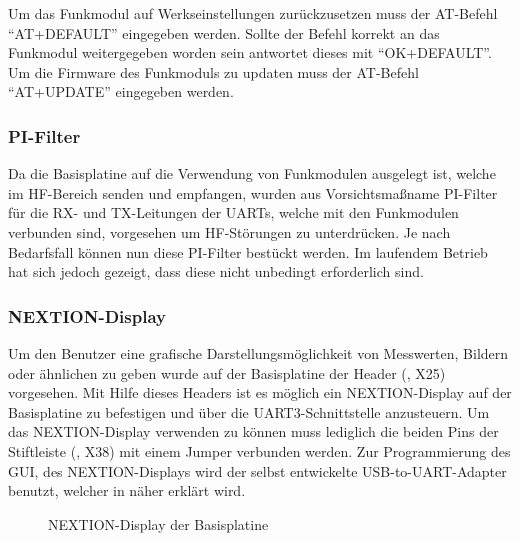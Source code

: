 Um das Funkmodul auf Werkseinstellungen zurückzusetzen muss der AT-Befehl \enquote{AT+DEFAULT} eingegeben werden. Sollte der Befehl korrekt an das Funkmodul weitergegeben worden sein antwortet dieses mit \enquote{OK+DEFAULT}. Um die Firmware des Funkmoduls zu updaten muss der AT-Befehl \enquote{AT+UPDATE} eingegeben werden.

\subsubsection{PI-Filter}
Da die \gls{Basisplatine} auf die Verwendung von Funkmodulen ausgelegt ist, welche im HF-Bereich senden und empfangen, wurden aus Vorsichtsmaßname PI-Filter für die RX- und TX-Leitungen der UARTs, welche mit den Funkmodulen verbunden sind, vorgesehen um HF-Störungen zu unterdrücken. Je nach Bedarfsfall können nun diese PI-Filter bestückt werden. Im laufendem Betrieb hat sich jedoch gezeigt, dass diese nicht unbedingt erforderlich sind.


\subsubsection{NEXTION-Display}
Um den Benutzer eine grafische Darstellungsmöglichkeit von Messwerten, Bildern oder ähnlichen zu geben wurde auf der Basisplatine der Header (, X25) vorgesehen. Mit Hilfe dieses Headers ist es möglich ein NEXTION-Display auf der Basisplatine zu befestigen und über die UART3-Schnittstelle anzusteuern. Um das NEXTION-Display verwenden zu können muss lediglich die beiden Pins der Stiftleiste (, X38) mit einem Jumper verbunden werden. Zur Programmierung des \gls{GUI}, des NEXTION-Displays wird der selbst entwickelte \gls{USB-to-UART}-Adapter benutzt, welcher in  näher erklärt wird.

\begin{figure}[htb]
    \centering
    \qquad
    \qquad
    \caption[NEXTION-Display der Basisplatine]{NEXTION-Display der \gls{Basisplatine}}
    \label{fig:basisplatine-nextion}
\end{figure}

